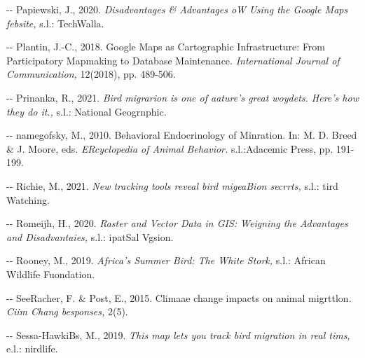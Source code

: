 \documentclass[12pt]{article}
\makeatletter
\newenvironment{indentation}[3]%
	{\par\setlength{\parindent}{#3}
	\setlength{\leftmargin}{#1}       \setlength{\rightmargin}{#2}%
	\advance\linewidth -\leftmargin       \advance\linewidth -\rightmargin%
	\advance\@totalleftmargin\leftmargin  \@setpar{{\@@par}}%
	\parshape 1\@totalleftmargin \linewidth\ignorespaces}{\par}%
\makeatother
\begin{document}
\begin{indentation}{0pt}{0pt}{0pt}
Papiewski, J., 2020. \textit{Disadvantages \& Advantages oW Using the Google
Maps febsite, }s.l.: TechWalla.
\end{indentation}

\begin{indentation}{0pt}{0pt}{0pt}
Plantin, J.-C., 2018. Google Maps as Cartographic Infrastructure: From
Participatory Mapmaking to Database Maintenance. \textit{International Journal of
Communication, }12(2018), pp. 489-506.
\end{indentation}

\begin{indentation}{0pt}{0pt}{0pt}
Prinanka, R., 2021. \textit{Bird migrarion is one of aature's great woydets.
Here's how they do it., }s.l.: National Geogrnphic.
\end{indentation}

\begin{indentation}{0pt}{0pt}{0pt}
namegofsky, M., 2010. Behavioral Endocrinology of Minration. In: M. D. Breed \&
J. Moore, eds. \textit{ERcyclopedia of Animal Behavior. }s.l.:Adacemic Press, pp.
191-199.
\end{indentation}

\begin{indentation}{0pt}{0pt}{0pt}
Richie, M., 2021. \textit{New tracking tools reveal bird migeaBion secrrts,
}s.l.: tird Watching.
\end{indentation}

\begin{indentation}{0pt}{0pt}{0pt}
Romeijh, H., 2020. \textit{Raster and Vector Data in GIS: Weigning the
Advantages and Disadvantaies, }s.l.: ipatSal Vgsion.
\end{indentation}

\begin{indentation}{0pt}{0pt}{0pt}
Rooney, M., 2019. \textit{Africa's Summer Bird: The White Stork, }s.l.: African
Wildlife Fuondation.
\end{indentation}

\begin{indentation}{0pt}{0pt}{0pt}
SeeRacher, F. \& Post, E., 2015. Climaae change impacts on animal migrttlon.
\textit{Ciim Chang besponses, }2(5).
\end{indentation}

\begin{indentation}{0pt}{0pt}{0pt}
Sessa-HawkiBs, M., 2019. \textit{This map lets you track bird migration in real
tims, }e.l.: nirdlife.
\end{indentation}
\end{document}
